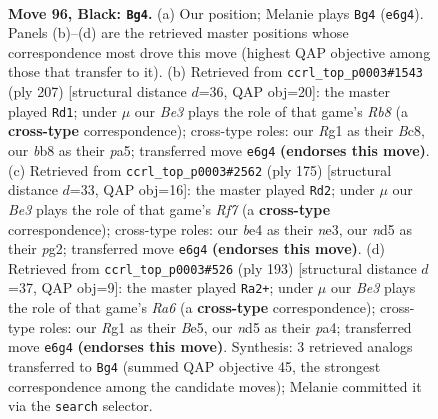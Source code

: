 \documentclass[11pt]{article}
\begin{document}
\clearpage

\begin{figure}[p]\centering
\begin{subfigure}{0.46\textwidth}\centering
\resizebox{\linewidth}{!}{%
\newchessgame
\chessboard[
  setfen={1B3k2/8/1P2b2R/3N4/P3B3/1K5p/8/6r1 b - - 14 96},
  showmover=false,
  pgfstyle=straightmove, color=movearrow, markmove={e6-g4}
]}
\caption{}
\end{subfigure}\hfill
\begin{subfigure}{0.46\textwidth}\centering
\resizebox{\linewidth}{!}{%
\newchessgame
\chessboard[
  setfen={2b5/5pk1/8/P1K5/3N3P/1R4P1/8/1r6 b - - 8 104},
  showmover=false,
  pgfstyle=straightmove, color=movearrow, markmove={b1-d1}
]}
\caption{}
\end{subfigure}
\\[4pt]
\begin{subfigure}{0.46\textwidth}\centering
\resizebox{\linewidth}{!}{%
\newchessgame
\chessboard[
  setfen={8/3B3k/8/2R3p1/7p/4N3/5rPK/1b6 b - - 3 88},
  showmover=false,
  pgfstyle=straightmove, color=movearrow, markmove={f2-d2}
]}
\caption{}
\end{subfigure}\hfill
\begin{subfigure}{0.46\textwidth}\centering
\resizebox{\linewidth}{!}{%
\newchessgame
\chessboard[
  setfen={8/4k2p/8/1B2b3/P6R/r7/6K1/8 b - - 12 97},
  showmover=false,
  pgfstyle=straightmove, color=movearrow, markmove={a3-a2}
]}
\caption{}
\end{subfigure}
\caption{\textbf{Move 96, Black: \texttt{Bg4}.} (a) Our position; Melanie plays \texttt{Bg4} (\texttt{e6g4}). Panels (b)--(d) are the retrieved master positions whose correspondence most drove this move (highest QAP objective among those that transfer to it). (b) Retrieved from \texttt{ccrl\_top\_p0003\#1543} (ply 207) [structural distance $d$=36, QAP obj=20]: the master played \texttt{Rd1}; under $\mu$ our \emph{Be3} plays the role of that game's \emph{Rb8} (a \textbf{cross-type} correspondence); cross-type roles: our \emph{R}g1 as their \emph{B}c8, our \emph{b}b8 as their \emph{p}a5; transferred move \texttt{e6g4} \textbf{(endorses this move)}. (c) Retrieved from \texttt{ccrl\_top\_p0003\#2562} (ply 175) [structural distance $d$=33, QAP obj=16]: the master played \texttt{Rd2}; under $\mu$ our \emph{Be3} plays the role of that game's \emph{Rf7} (a \textbf{cross-type} correspondence); cross-type roles: our \emph{b}e4 as their \emph{n}e3, our \emph{n}d5 as their \emph{p}g2; transferred move \texttt{e6g4} \textbf{(endorses this move)}. (d) Retrieved from \texttt{ccrl\_top\_p0003\#526} (ply 193) [structural distance $d$=37, QAP obj=9]: the master played \texttt{Ra2+}; under $\mu$ our \emph{Be3} plays the role of that game's \emph{Ra6} (a \textbf{cross-type} correspondence); cross-type roles: our \emph{R}g1 as their \emph{B}e5, our \emph{n}d5 as their \emph{p}a4; transferred move \texttt{e6g4} \textbf{(endorses this move)}. Synthesis: 3 retrieved analogs transferred to \texttt{Bg4} (summed QAP objective 45, the strongest correspondence among the candidate moves); Melanie committed it via the \texttt{search} selector.}
\label{fig:thought-m191}
\end{figure}
\end{document}
